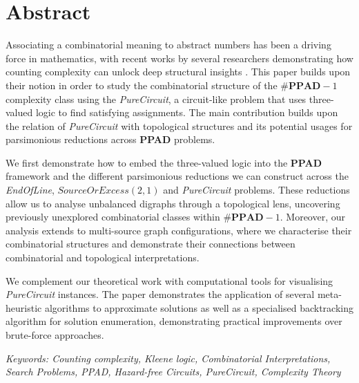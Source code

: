 
\section*{Abstract}
\vspace{1cm}

\large
Associating a combinatorial meaning to abstract numbers has
been a driving force in mathematics,
with recent works by several researchers demonstrating how counting complexity can unlock deep structural insights
\cite{pak_WhatCombinatorialInterpretation_2022,ikenmeyer_WhatWhatNot_2022}.
This paper builds upon their notion in order to study the combinatorial structure of the $\textbf{\#PPAD}-1$ complexity class
using the \textit{PureCircuit},
a circuit-like problem that uses three-valued logic to find satisfying assignments.
The main contribution builds upon the relation of \textit{PureCircuit} with topological structures
and its potential usages for parsimonious reductions across \textbf{PPAD} problems.

We first demonstrate how to embed the three-valued logic into the \textbf{PPAD} framework and
the different parsimonious reductions we can construct across the \textit{EndOfLine}, 
$\textit{SourceOrExcess}(2,1)$ and \textit{PureCircuit} problems.
These reductions allow us to analyse unbalanced digraphs through a topological lens,
uncovering previously unexplored combinatorial classes within $\textbf{\#PPAD}-1$.
Moreover, our analysis extends to multi-source graph configurations, where we characterise their combinatorial structures
and demonstrate their connections between combinatorial and topological interpretations.

We complement our theoretical work with computational tools for visualising \textit{PureCircuit} instances.
The paper demonstrates the application of several meta-heuristic algorithms to approximate solutions
as well as a specialised backtracking algorithm for solution enumeration,
demonstrating practical improvements over brute-force approaches.




\vspace{1cm}

\noindent \textit{Keywords: Counting complexity, Kleene logic, Combinatorial Interpretations,
    Search Problems, PPAD, Hazard-free Circuits, PureCircuit, Complexity Theory}